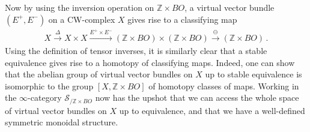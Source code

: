 \documentclass[10pt]{amsart}
\numberwithin{equation}{section}
\theoremstyle{definition}
\newcommand{\bZ}{\mathbb{Z}}
\newcommand{\cS}{\mathcal{S}}
\begin{document}
Now by using the inversion operation on $\bZ\times BO$, a virtual vector bundle $(E^{+}, E^{-})$ on a CW-complex $X$ gives rise to a classifying map
\begin{align*}
	X \xrightarrow{\Delta} X\times X \xrightarrow{E^{+}\times E^{-}} (\bZ\times BO) \times (\bZ\times BO) \xrightarrow{ \ominus} (\bZ\times BO) \,.
\end{align*}
Using the definition of tensor inverses, it is similarly clear that a stable equivalence gives rise to a homotopy of classifying maps.
Indeed, one can show that the abelian group of virtual vector bundles on $X$ up to stable equivalence is isomorphic to the group $[X,\bZ\times BO]$ of homotopy classes of maps.
Working in the $\infty$-category $\cS_{/\bZ\times BO}$ now has the upshot that we can access the whole space of virtual vector bundles on $X$ up to equivalence, and that we have a well-defined symmetric monoidal structure.
\end{document}
